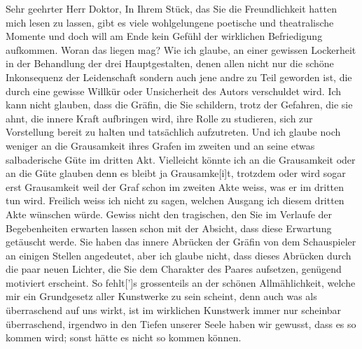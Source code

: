 \pstart\center{}Sehr geehrter Herr Doktor,\pend\vspace{0.5em}
\pstart
           In Ihrem Stück, das Sie die
               Freundlichkeit hatten mich lesen zu lassen, gibt es viele wohlgelungene poetische und
               theatralische Momente und doch will am Ende kein Gefühl der wirklichen Befriedigung
               aufkommen. Woran das liegen mag? Wie ich glaube, an einer gewissen Lockerheit in der
               Behandlung der drei Hauptgestalten, denen allen nicht nur die schöne Inkonsequenz der
               Leidenschaft sondern auch jene andre zu Teil geworden ist, die durch eine gewisse
               Willkür oder Unsicherheit des Autors verschuldet wird. Ich kann nicht glauben, dass
               die Gräfin, die Sie schildern, trotz der Gefahren, die sie ahnt, die innere Kraft
               aufbringen wird, ihre Rolle zu studieren, sich zur Vorstellung bereit zu halten und
               tatsächlich aufzutreten. Und ich glaube noch weniger an die Grausamkeit ihres Grafen
               im zweiten und an seine etwas salbaderische Güte im dritten Akt. Vielleicht könnte
               ich an die Grausamkeit oder an {\pb}die Güte glauben  denn es bleibt ja Grausamke{[}i{]}t,
               trotzdem oder wird sogar erst Grausamkeit weil der Graf schon im zweiten Akte weiss,
               was er im dritten tun wird. Freilich weiss ich nicht zu sagen, welchen Ausgang ich
               diesem dritten Akte wünschen würde. Gewiss nicht den tragischen, den Sie im Verlaufe
               der Begebenheiten erwarten lassen schon mit der Absicht, dass diese Erwartung
               getäuscht werde. Sie haben das innere Abrücken der Gräfin von dem Schauspieler an
               einigen Stellen angedeutet, aber ich glaube nicht, dass dieses Abrücken durch die
               paar neuen Lichter, die Sie dem Charakter des Paares aufsetzen, genügend motiviert
               erscheint. So fehlt{[}’{]}s grossenteils an der schönen
               Allmählichkeit, welche mir ein Grundgesetz aller Kunstwerke zu sein scheint, denn
               auch was als überraschend auf uns wirkt, ist im wirklichen Kunstwerk immer nur
               scheinbar überraschend, irgendwo in den Tiefen unserer Seele haben wir gewusst, dass
               es so kommen wird; sonst hätte es nicht so kommen können.\pend
           
